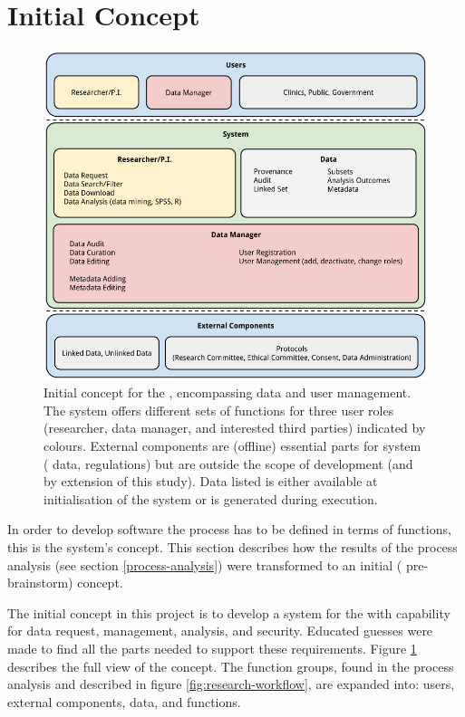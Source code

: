 \section{Initial Concept}
\label{initial-concept}

\begin{figure}[h]
	\centering
	\includegraphics[width=1.0\linewidth]{images/brainstorm-before}
	\caption{
		Initial concept for the \ivfsystem{}, encompassing data and user management. 
		The system offers different sets of functions for three user roles (researcher, data manager, and interested third parties) indicated by colours. 
		External components are (offline) essential parts for system (\eg{} data, regulations) but are outside the scope of development (and by extension of this study).
		Data listed is either available at initialisation of the system or is generated during execution.
	}
	\label{fig:brainstorm-before}
\end{figure}

\noindent
In order to develop software the process has to be defined in terms of functions, this is the system's concept.
This section describes how the results of the process analysis (see section \ref{process-analysis}) were transformed to an initial (\ie{} pre-brainstorm) concept.

The initial concept in this project is to develop a system for the \projectdata{} with capability for data request, management, analysis, and security.
Educated guesses were made to find all the parts needed to support these requirements.
Figure \ref{fig:brainstorm-before} describes the full view of the concept. 
The function groups, found in the process analysis and described in figure \ref{fig:research-workflow}, are expanded into: users, external components, data, and functions.

